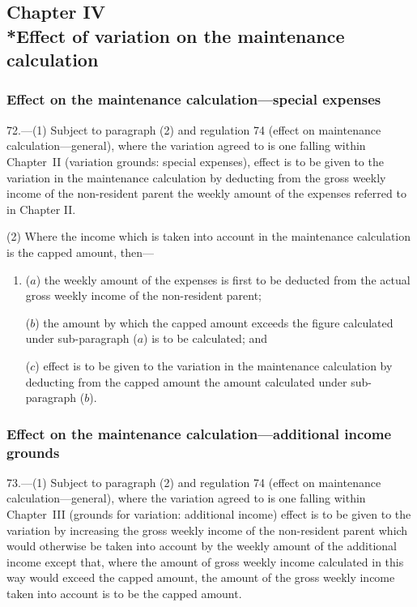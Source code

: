 \documentclass[12pt,a4paper]{article}
\begin{document}
\subsection[Chapter IV --- Effect of variation on the maintenance calculation]{Chapter IV\\*Effect of variation on the maintenance calculation}

\renewcommand\parthead{--- Part V Chapter IV}

\subsubsection[72. Effect on the maintenance calculation---special expenses]{Effect on the maintenance calculation---special expenses}

72.---(1)  Subject to paragraph (2) and regulation 74 (effect on maintenance calculation---general), where the variation agreed to is one falling within Chapter~II (variation grounds: special expenses), effect is to be given to the variation in the maintenance calculation by deducting from the gross weekly income of the non-resident parent the weekly amount of the expenses referred to in Chapter II.

(2) Where the income which is taken into account in the maintenance calculation is the capped amount, then—
\begin{enumerate}\item[]
($a$) the weekly amount of the expenses is first to be deducted from the actual gross weekly income of the non-resident parent;

($b$) the amount by which the capped amount exceeds the figure calculated under sub-paragraph ($a$)  is to be calculated; and

($c$) effect is to be given to the variation in the maintenance calculation by deducting from the capped amount the amount calculated under sub-paragraph ($b$).
\end{enumerate}

\subsubsection[73. Effect on the maintenance calculation---additional income grounds]{Effect on the maintenance calculation---additional income grounds}

73.---(1)  Subject to paragraph (2) and regulation 74 (effect on maintenance calculation---general), where the variation agreed to is one falling within Chapter~III (grounds for variation: additional income) effect is to be given to the variation by increasing the gross weekly income of the non-resident parent which would otherwise be taken into account by the weekly amount of the additional income except that, where the amount of gross weekly income calculated in this way would exceed the capped amount, the amount of the gross weekly income taken into account is to be the capped amount.
\end{document}
